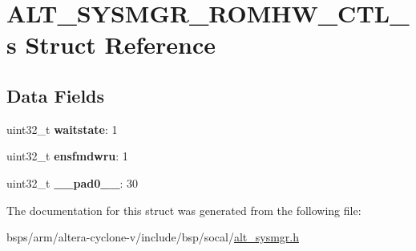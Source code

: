 \hypertarget{structALT__SYSMGR__ROMHW__CTL__s}{}\section{A\+L\+T\+\_\+\+S\+Y\+S\+M\+G\+R\+\_\+\+R\+O\+M\+H\+W\+\_\+\+C\+T\+L\+\_\+s Struct Reference}
\label{structALT__SYSMGR__ROMHW__CTL__s}
\subsection*{Data Fields}
\begin{DoxyCompactItemize}
\item 
\mbox{\label{structALT__SYSMGR__ROMHW__CTL__s_add1f914afa82e0c801fbbc99f4e3bab4}} 
uint32\+\_\+t {\bfseries waitstate}\+: 1
\item 
\mbox{\label{structALT__SYSMGR__ROMHW__CTL__s_a7427a327898ed010883fb6ec85acb8f1}} 
uint32\+\_\+t {\bfseries ensfmdwru}\+: 1
\item 
\mbox{\label{structALT__SYSMGR__ROMHW__CTL__s_af2cefdf08cbea9be078f5cc8389a06f4}} 
uint32\+\_\+t {\bfseries \+\_\+\+\_\+pad0\+\_\+\+\_\+}\+: 30
\end{DoxyCompactItemize}


The documentation for this struct was generated from the following file\+:\begin{DoxyCompactItemize}
\item 
bsps/arm/altera-\/cyclone-\/v/include/bsp/socal/\mbox{\hyperlink{alt__sysmgr_8h}{alt\+\_\+sysmgr.\+h}}\end{DoxyCompactItemize}
